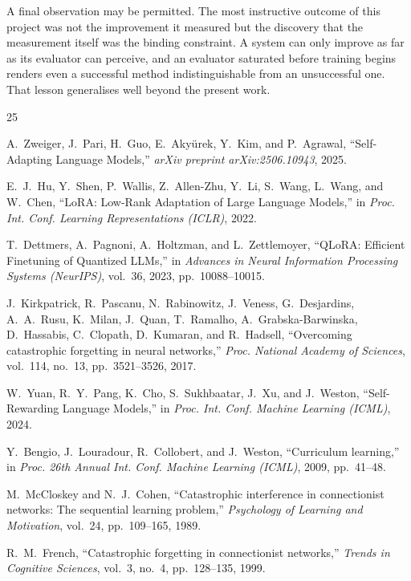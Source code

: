 \documentclass[12pt,a4paper]{report}
\begin{document}
A final observation may be permitted. The most instructive outcome of this project was not the improvement it measured but the discovery that the measurement itself was the binding constraint. A system can only improve as far as its evaluator can perceive, and an evaluator saturated before training begins renders even a successful method indistinguishable from an unsuccessful one. That lesson generalises well beyond the present work.

\begin{thebibliography}{25}

A.~Zweiger, J.~Pari, H.~Guo, E.~Aky\"{u}rek, Y.~Kim, and P.~Agrawal, ``Self-Adapting Language Models,'' \textit{arXiv preprint arXiv:2506.10943}, 2025.

E.~J.~Hu, Y.~Shen, P.~Wallis, Z.~Allen-Zhu, Y.~Li, S.~Wang, L.~Wang, and W.~Chen, ``LoRA: Low-Rank Adaptation of Large Language Models,'' in \textit{Proc. Int. Conf. Learning Representations (ICLR)}, 2022.

T.~Dettmers, A.~Pagnoni, A.~Holtzman, and L.~Zettlemoyer, ``QLoRA: Efficient Finetuning of Quantized LLMs,'' in \textit{Advances in Neural Information Processing Systems (NeurIPS)}, vol.~36, 2023, pp.~10088--10015.

J.~Kirkpatrick, R.~Pascanu, N.~Rabinowitz, J.~Veness, G.~Desjardins, A.~A.~Rusu, K.~Milan, J.~Quan, T.~Ramalho, A.~Grabska-Barwinska, D.~Hassabis, C.~Clopath, D.~Kumaran, and R.~Hadsell, ``Overcoming catastrophic forgetting in neural networks,'' \textit{Proc. National Academy of Sciences}, vol.~114, no.~13, pp.~3521--3526, 2017.

W.~Yuan, R.~Y.~Pang, K.~Cho, S.~Sukhbaatar, J.~Xu, and J.~Weston, ``Self-Rewarding Language Models,'' in \textit{Proc. Int. Conf. Machine Learning (ICML)}, 2024.

Y.~Bengio, J.~Louradour, R.~Collobert, and J.~Weston, ``Curriculum learning,'' in \textit{Proc. 26th Annual Int. Conf. Machine Learning (ICML)}, 2009, pp.~41--48.

M.~McCloskey and N.~J.~Cohen, ``Catastrophic interference in connectionist networks: The sequential learning problem,'' \textit{Psychology of Learning and Motivation}, vol.~24, pp.~109--165, 1989.

R.~M.~French, ``Catastrophic forgetting in connectionist networks,'' \textit{Trends in Cognitive Sciences}, vol.~3, no.~4, pp.~128--135, 1999.


\end{thebibliography}
\end{document}
